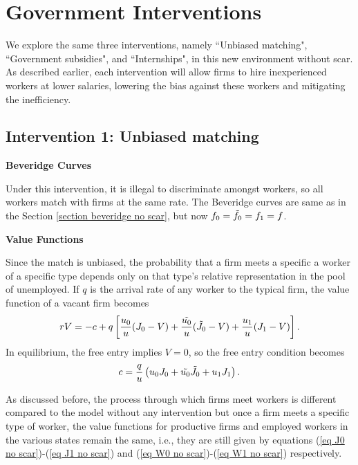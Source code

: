 \documentclass[12pt]{article} %
\theoremstyle{definition}
\begin{document}



\section{Government Interventions}
We explore the same three interventions, namely ``Unbiased matching", ``Government subsidies", and ``Internships", in this new environment without scar. As described earlier, each intervention will allow firms to hire inexperienced workers at lower salaries, lowering the bias against these workers and mitigating the inefficiency. 

\subsection{Intervention 1: Unbiased matching}\label{section unbiased matching}

\textbf{Beveridge Curves} 

\noindent Under this intervention, it is illegal to discriminate amongst workers, so all workers match with firms at the same rate. The Beveridge curves are same as in the Section \ref{section beveridge no scar}, but now $f_0=\Tilde{f_0}=f_1=f$.  

\bigskip 

\noindent \textbf{Value Functions}

\noindent Since the match is unbiased, the probability that a firm meets a specific a worker of a specific type depends only on that type's relative representation in the pool of unemployed. If $q$ is the arrival rate of any worker to the typical firm, the value function of a vacant firm becomes
\begin{equation}
   rV = -c + q \left[\frac{u_0}{u}(J_0-V) + \frac{\Tilde{u_0}}{u}(\Tilde{J_0}-V) + \frac{u_1}{u}(J_1-V) \right].\nonumber 
\end{equation} In equilibrium, the free entry implies $V=0$, so the free entry condition becomes
\begin{equation}
 c = \frac{q}{u} \left({u_0} J_0 + \Tilde{u_0} \Tilde{J_0} + {u_1} J_1 \right).\label{eq free entry intervention 1 no scar} 
\end{equation}

As discussed before, the process through which firms meet workers is different compared to the model without any intervention but once a firm meets a specific type of worker, the value functions for productive firms and employed workers in the various states remain the same, i.e., they are still given by equations (\ref{eq J0 no scar})-(\ref{eq J1 no scar}) and (\ref{eq W0 no scar})-(\ref{eq W1 no scar}) respectively. 
\end{document}
